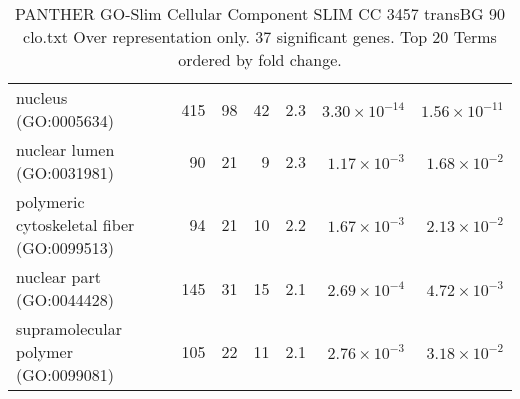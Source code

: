 \begin{table}[ht]
\begin{adjustbox}{width=\textwidth}
\begin{tabular}{lrrrrrr}
  nucleus (GO:0005634) & 415 & 98 & 42 & 2.3 & $3.30 \times 10^{-14}$ & $1.56 \times 10^{-11}$ \\ 
  nuclear lumen (GO:0031981) & 90 & 21 & 9 & 2.3 & $1.17 \times 10^{-3}$ & $1.68 \times 10^{-2}$ \\ 
  polymeric cytoskeletal fiber (GO:0099513) & 94 & 21 & 10 & 2.2 & $1.67 \times 10^{-3}$ & $2.13 \times 10^{-2}$ \\ 
  nuclear part (GO:0044428) & 145 & 31 & 15 & 2.1 & $2.69 \times 10^{-4}$ & $4.72 \times 10^{-3}$ \\ 
  supramolecular polymer (GO:0099081) & 105 & 22 & 11 & 2.1 & $2.76 \times 10^{-3}$ & $3.18 \times 10^{-2}$ \\ 
   \hline
\end{tabular}
\end{adjustbox}
\caption{PANTHER GO-Slim Cellular Component SLIM CC 3457 transBG 90 clo.txt Over representation only. 37 significant genes. Top 20 Terms ordered by fold change. } 
\label{tab:PANTHER GO-Slim Cellular Component SLIM CC 3457 transBG 90 clo.txt Over representation only. 37 significant genes. Top 20 Terms ordered by fold change. }
\end{table}


